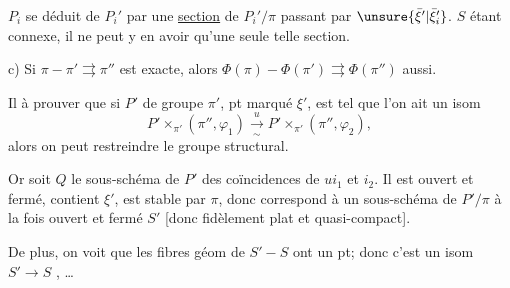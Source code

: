  $P_i$ se déduit de $P_i'$ par une \uline{section} de $P_i'/\pi$ passant par $\unsure{\bar\xi'|\bar\xi_i'}$. $S$ étant connexe, il ne peut y en avoir qu'une seule telle section.

c) Si $\pi\mathbin{-}\pi'\rightrightarrows\pi''$ est exacte, alors \deleted{$\unsure{\Phi}$} $\Phi(\pi)\mathbin{-}\Phi(\pi')\rightrightarrows\Phi(\pi'')$ aussi.

Il  à prouver que si $P'$ de groupe $\pi'$, pt marqué $\xi'$, est tel que  l'on ait un isom
\[
P'\times_{\pi'}(\pi'',\varphi_1)\xrightarrow[\sim]{u}
P'\times_{\pi'}(\pi'',\varphi_2),
\]
alors on peut restreindre le groupe structural.

Or soit $Q$ le sous-schéma de $P'$ des coïncidences de $u i_1$ et $i_2$. Il est ouvert et fermé, contient $\xi'$, est stable par $\pi$, donc correspond à un sous-schéma de $P'/\pi$ à la fois ouvert et fermé $S'$ [donc  fidèlement plat et quasi-compact].


De plus, on voit que les  fibres géom de $S'\mathbin{-}S$ ont  un pt; donc c'est un isom $S'\to S$ , \ldots
